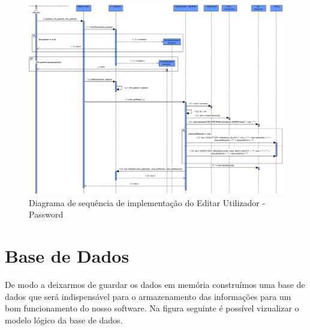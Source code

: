 \documentclass[a4paper]{report}
\begin{document}
\begin{figure}[H]
	\centering 
    \includegraphics[width=\textwidth]{images/editUserPassImp.png}  
    \caption{Diagrama de sequência de implementação do Editar Utilizador - Password}
\end{figure}

\chapter{Base de Dados}

De modo a deixarmos de guardar os dados em memória construímos uma base de dados
que será indispensável para o armazenamento das informações para um bom funcionamento
do nosso software.
Na figura seguinte é possível vizualizar o modelo lógico da base de dados.
\end{document}
